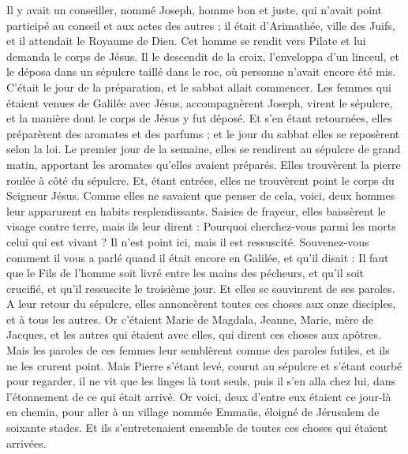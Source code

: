 \begin{multicols}{2}
Il y avait un conseiller, nommé Joseph, homme bon et juste,
qui n'avait point participé au conseil et aux actes des autres ; il était d'Arimathée, ville des Juifs, et il attendait le Royaume de Dieu.
Cet homme se rendit vers Pilate et lui demanda le corps de Jésus.
Il le descendit de la croix, l'enveloppa d’un linceul, et le déposa dans un sépulcre taillé dans le roc, où personne n'avait encore été mis.
C’était le jour de la préparation, et le sabbat allait commencer.
Les femmes qui étaient venues de Galilée avec Jésus, accompagnèrent Joseph, virent le sépulcre, et la manière dont le corps de Jésus y fut déposé.
Et s'en étant retournées, elles préparèrent des aromates et des parfums ; et le jour du sabbat elles se reposèrent selon la loi.
\VerseOne{}Le premier jour de la semaine, elles se rendirent au sépulcre de grand matin, apportant les aromates qu'elles avaient préparés.
Elles trouvèrent la pierre roulée à côté du sépulcre.
Et, étant entrées, elles ne trouvèrent point le corps du Seigneur Jésus.
Comme elles ne savaient que penser de cela, voici, deux hommes leur apparurent en habits resplendissants.
Saisies de frayeur, elles baissèrent le visage contre terre, mais ils leur dirent : Pourquoi cherchez-vous parmi les morts celui qui est vivant ?
Il n'est point ici, mais il est ressuscité. Souvenez-vous comment il vous a parlé quand il était encore en Galilée,
et qu’il disait : Il faut que le Fils de l'homme soit livré entre les mains des pécheurs, et qu'il soit crucifié, et qu'il ressuscite le troisième jour.
Et elles se souvinrent de ses paroles.
A leur retour du sépulcre, elles annoncèrent toutes ces choses aux onze disciples, et à tous les autres.
Or c’étaient Marie de Magdala, Jeanne, Marie, mère de Jacques, et les autres qui étaient avec elles, qui dirent ces choses aux apôtres.
Mais les paroles de ces femmes leur semblèrent comme des paroles futiles, et ils ne les crurent point.
Mais Pierre s'étant levé, courut au sépulcre et s'étant courbé pour regarder, il ne vit que les linges là tout seuls, puis il s’en alla chez lui, dans l’étonnement de ce qui était arrivé.
Or voici, deux d'entre eux étaient ce jour-là en chemin, pour aller à un village nommée Emmaüs, éloigné de Jérusalem de soixante stades.
Et ils s'entretenaient ensemble de toutes ces choses qui étaient arrivées.

\end{multicols}
